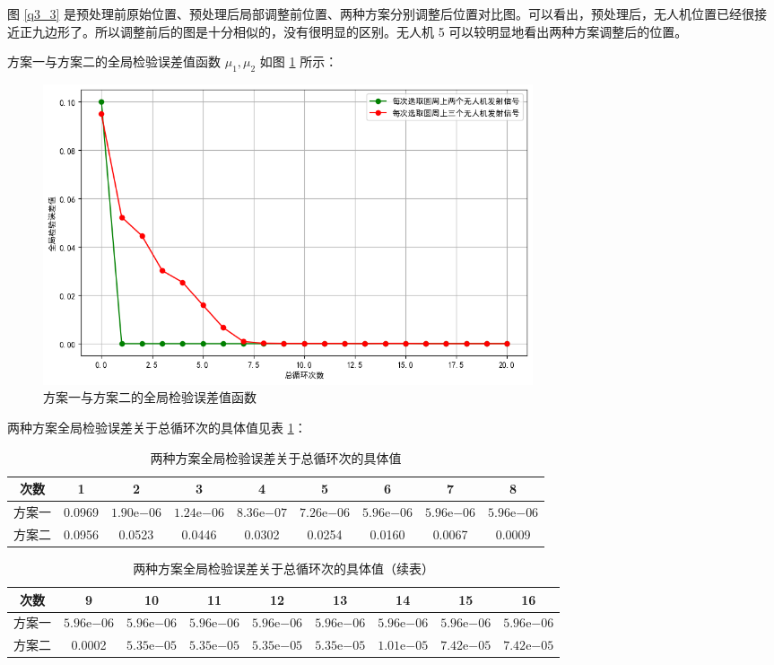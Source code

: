 \documentclass[withoutpreface,bwprint]{cumcmthesis} %
\begin{document}
图 \ref{q3_3} 是预处理前原始位置、预处理后局部调整前位置、两种方案分别调整后位置对比图。可以看出，预处理后，无人机位置已经很接近正九边形了。所以调整前后的图是十分相似的，没有很明显的区别。无人机 5 可以较明显地看出两种方案调整后的位置。

方案一与方案二的全局检验误差值函数 \( \mu_1, \mu_2 \) 如图 \ref{q3_4} 所示：

\begin{figure}[H]
  \centering
  \includegraphics[width=0.7\textwidth]{../../figure/q3_4.png} %
  \caption{方案一与方案二的全局检验误差值函数}
  \label{q3_4}
\end{figure}

两种方案全局检验误差关于总循环次的具体值见表 \ref{tab:error_cycle}：

\begin{table}[H]
  \centering
  \caption{两种方案全局检验误差关于总循环次的具体值}
  \label{tab:error_cycle}
  \begin{tabular}{ccccccccc}
    \toprule
    次数 & 1 & 2 & 3 & 4 & 5 & 6 & 7 & 8 \\
    \midrule
    方案一 & 0.0969 & $1.90\mathrm{e}{-06}$ & $1.24\mathrm{e}{-06}$ & $8.36\mathrm{e}{-07}$ & $7.26\mathrm{e}{-06}$ & $5.96\mathrm{e}{-06}$ & $5.96\mathrm{e}{-06}$ & $5.96\mathrm{e}{-06}$ \\
    方案二 & 0.0956 & 0.0523 & 0.0446 & 0.0302 & 0.0254 & 0.0160 & 0.0067 & 0.0009 \\
    \bottomrule
  \end{tabular}
\end{table}

\begin{table}[H]
  \centering
  \caption{两种方案全局检验误差关于总循环次的具体值（续表）}
  \label{tab:error_cycle_continue}
  \begin{tabular}{ccccccccc}
    \toprule
    次数 & 9 & 10 & 11 & 12 & 13 & 14 & 15 & 16 \\
    \midrule
    方案一 & $5.96\mathrm{e}{-06}$ & $5.96\mathrm{e}{-06}$ & $5.96\mathrm{e}{-06}$ & $5.96\mathrm{e}{-06}$ & $5.96\mathrm{e}{-06}$ & $5.96\mathrm{e}{-06}$ & $5.96\mathrm{e}{-06}$ & $5.96\mathrm{e}{-06}$ \\
    方案二 & 0.0002 & $5.35\mathrm{e}{-05}$ & $5.35\mathrm{e}{-05}$ & $5.35\mathrm{e}{-05}$ & $5.35\mathrm{e}{-05}$ & $1.01\mathrm{e}{-05}$ & $7.42\mathrm{e}{-05}$ & $7.42\mathrm{e}{-05}$ \\
    \bottomrule
  \end{tabular}
\end{table}
\end{document}
